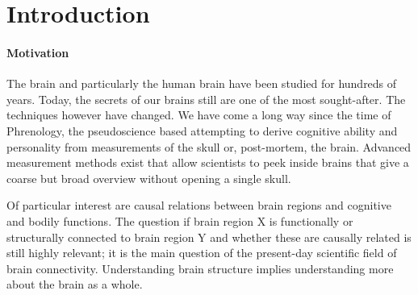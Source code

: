 \documentclass[a4paper, 10pt, english, twocolumn]{article}
\title{\fontfamily{phv}\selectfont{Causal Discovery methods for Effective Connectivity}}
\author{
  \textbf{R. Janssen} - \href{mailto:ramon.janssen@student.ru.nl}{ramon.janssen@student.ru.nl} \\
  \textbf{T. de Ruijter} - \href{mailto:t.deruijter@student.ru.nl}{t.deruijter@student.ru.nl}\\
  \textbf{T. Claassen} - \href{mailto:tomc@cs.ru.nl}{tomc@cs.ru.nl}\\
  \textbf{M. Hinne} - \href{mailto:mhinne@cs.ru.nl}{mhinne@cs.ru.nl}
}
\date{\fontfamily{ptm}\selectfont{\small{\bfseries{\today - Radboud
Universiteit Nijmegen}}}\\[0.5cm]\rule{\linewidth}{0.3mm}}
\newcommand{\keywords}[1]{\par\noindent 
{\bf Keywords\/}. #1}
\begin{document}
\maketitle

\begin{abstract}
In the field of brain research, different forms of connectivity are considered. To find effective connectivity, many different approaches have been used. In this project, we will apply causal discovery the methods of PC and BCCD to structural and functional connectivity, to infer effective connectivity. As data from multiple subjects will be used, evaluation of the result can show whether the method yields consistent results.
\keywords{Keywords}
\end{abstract}

\setlength{\parindent}{0.0cm}
\setlength{\parskip}{0.25cm}

\section{Introduction}


\paragraph{Motivation}
The brain and particularly the human brain have been studied for hundreds of years.
Today, the secrets of our brains still are one of the most sought-after.
The techniques however have changed.
We have come a long way since the time of Phrenology, the pseudoscience based attempting to derive cognitive ability and personality from measurements of the skull or, post-mortem, the brain.
Advanced measurement methods exist that allow scientists to peek inside brains that give a coarse but broad overview without opening a single skull.

Of particular interest are causal relations between brain regions and cognitive and bodily functions.
The question if brain region X is functionally or structurally connected to brain region Y and whether these are causally related is still highly relevant; it is the main question of the present-day scientific field of brain connectivity.
Understanding brain structure implies understanding more about the brain as a whole.
\end{document}
